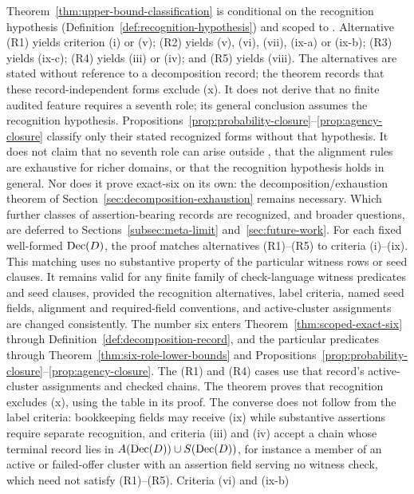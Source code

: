 \begin{remark}\label{rem:classification-scope}
Theorem~\ref{thm:upper-bound-classification} is conditional on the recognition
hypothesis (Definition~\ref{def:recognition-hypothesis}) and scoped to \FATCD{}.
Alternative (R1) yields criterion (i) or (v); (R2) yields (v), (vi),
(vii), (ix-a) or (ix-b); (R3) yields (ix-c); (R4) yields (iii) or (iv); and
(R5) yields (viii). The alternatives are stated without reference to a
decomposition record; the theorem records that these
record-independent forms exclude (x). It does not derive that no finite audited feature requires a seventh role; its general conclusion assumes the recognition hypothesis. Propositions~\ref{prop:probability-closure}--\ref{prop:agency-closure} classify only their stated recognized forms without that hypothesis. It does
not claim that no seventh role can arise outside \FATCD{}, that the alignment
rules are exhaustive for richer domains, or that the recognition hypothesis holds
in general. Nor does it prove exact-six on its own: the decomposition/exhaustion
theorem of Section~\ref{sec:decomposition-exhaustion} remains necessary. Which further
classes of assertion-bearing records are recognized, and broader questions, are deferred to
Sections~\ref{subsec:meta-limit} and~\ref{sec:future-work}.
For each fixed well-formed \(\operatorname{Dec}\!\left(D\right)\), the proof matches alternatives
(R1)--(R5) to criteria (i)--(ix). This matching uses no substantive
property of the particular witness rows or seed clauses. It remains
valid for any finite family of check-language witness predicates and
seed clauses, provided the recognition alternatives, label criteria,
named seed fields, alignment and required-field conventions, and
active-cluster assignments are changed consistently. The number six enters
Theorem~\ref{thm:scoped-exact-six} through
Definition~\ref{def:decomposition-record}, and the particular predicates
through Theorem~\ref{thm:six-role-lower-bounds} and
Propositions~\ref{prop:probability-closure}--\ref{prop:agency-closure}. The (R1) and (R4) cases use that record's
active-cluster assignments and checked chains. The theorem proves that recognition excludes (x), using the table in its
proof. The converse does not follow from the label criteria: bookkeeping fields
may receive (ix) while substantive assertions require separate recognition,
and criteria (iii) and (iv) accept a chain whose terminal record lies in \(A(\operatorname{Dec}\!\left(D\right))\cup S(\operatorname{Dec}\!\left(D\right))\), for instance a member of an active or failed-offer cluster with an assertion field serving no witness check, which need not satisfy (R1)--(R5). Criteria (vi) and (ix-b)

\end{remark}
